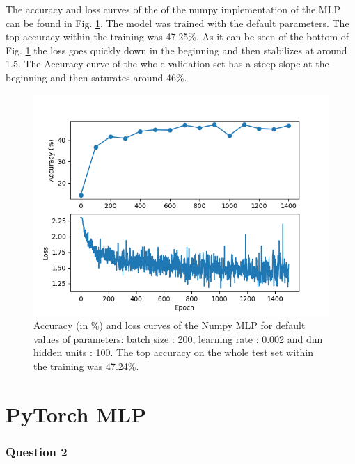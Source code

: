 \documentclass{article}
\begin{document}
The accuracy and loss curves of the of the numpy implementation of the MLP can be found in Fig. \ref{numpy_mlp}. The model was trained with the default parameters. The top accuracy within the training was 47.25\%. As it can be seen of the bottom of Fig. \ref{numpy_mlp} the loss goes quickly down in the beginning and then stabilizes at around 1.5. The Accuracy curve of the whole validation set has a steep slope at the beginning and then saturates around 46\%.
\begin{figure}[h!]
    \centering
  \centering
  \includegraphics[scale=0.5]{numpy_mlp.png}
  \caption{Accuracy (in \%) and loss curves of the Numpy MLP for default values of parameters: batch size : 200, learning rate : 0.002 and dnn hidden units : 100. The top accuracy on the whole test set within the training was 47.24\%.}
  \label{numpy_mlp}
\end{figure}



\section{PyTorch MLP}
\subsubsection*{Question 2}
\end{document}
